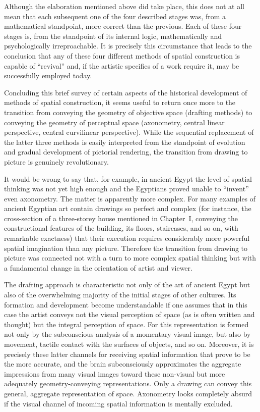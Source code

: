 Although the elaboration mentioned above did take place, this does not at all mean that
each subsequent one of the four described stages was, from a mathematical standpoint, more
correct than the previous.  Each of these four stages is, from the standpoint of its
internal logic, mathematically and psychologically irreproachable.  It is precisely this
circumstance that leads to the conclusion that any of these four different methods of
spatial construction is capable of ``revival'' and, if the artistic specifics of a work
require it, may be successfully employed today.

Concluding this brief survey of certain aspects of the historical development of methods
of spatial construction, it seems useful to return once more to the transition from
conveying the geometry of objective space (drafting methods) to conveying the geometry
of perceptual space (axonometry, central linear perspective, central curvilinear
perspective).  While the sequential replacement of the latter three methods is easily
interpreted from the standpoint of evolution and gradual development of pictorial
rendering, the transition from drawing to picture is genuinely revolutionary.

It would be wrong to say that, for example, in ancient Egypt the level of spatial thinking
was not yet high enough and the Egyptians proved unable to ``invent'' even axonometry.
The matter is apparently more complex.  For many examples of ancient Egyptian art contain
drawings so perfect and complex (for instance, the cross-section of a three-storey house
mentioned in Chapter~I, conveying the constructional features of the building, its floors,
staircases, and so on, with remarkable exactness) that their execution requires
considerably more powerful spatial imagination than any picture.  Therefore the transition
from drawing to picture was connected not with a turn to more complex spatial thinking but
with a fundamental change in the orientation of artist and viewer.


The drafting approach is characteristic not only of the art of ancient Egypt but also of
the overwhelming majority of the initial stages of other cultures.  Its formation and
development become understandable if one assumes that in this case the artist conveys not
the visual perception of space (as is often written and thought) but the integral
perception of space.  For this representation is formed not only by the subconscious
analysis of a momentary visual image, but also by movement, tactile contact with the
surfaces of objects, and so on.  Moreover, it is precisely these latter channels for
receiving spatial information that prove to be the more accurate, and the brain
subconsciously approximates the aggregate impressions from many visual images toward
these non-visual but more adequately geometry-conveying representations.  Only a drawing
can convey this general, aggregate representation of space.  Axonometry looks completely
absurd if the visual channel of incoming spatial information is mentally excluded.

